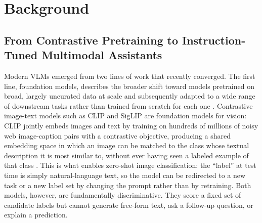 \documentclass[10pt,letterpaper]{article}
\begin{document}
\section{Background}
\label{sec:background}


\subsection{From Contrastive Pretraining to Instruction-Tuned Multimodal Assistants}
\label{sec:background_history}
Modern VLMs emerged from two lines of work that recently converged. The first line, foundation models, describes the broader shift toward models pretrained on broad, largely uncurated data at scale and subsequently adapted to a wide range of downstream tasks rather than trained from scratch for each one \cite{bommasani_opportunities_2021}. Contrastive image-text models such as CLIP and SigLIP are foundation models for vision: CLIP jointly embeds images and text by training on hundreds of millions of noisy web image-caption pairs with a contrastive objective, producing a shared embedding space in which an image can be matched to the class whose textual description it is most similar to, without ever having seen a labeled example of that class \cite{radford_learning_2021, zhai_sigmoid_2023}. This is what enables zero-shot image classification: the ``label'' at test time is simply natural-language text, so the model can be redirected to a new task or a new label set by changing the prompt rather than by retraining. Both models, however, are fundamentally discriminative. They score a fixed set of candidate labels but cannot generate free-form text, ask a follow-up question, or explain a prediction.
\end{document}
